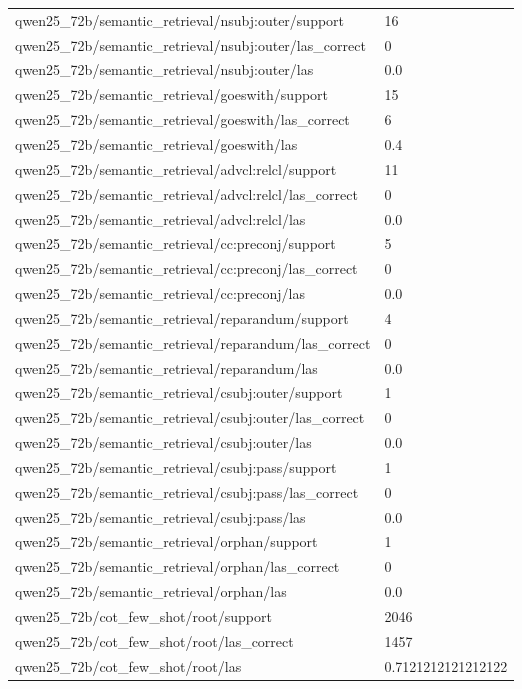 \begin{tabular}{ll}
qwen25\_72b/semantic\_retrieval/nsubj:outer/support & 16 \\
qwen25\_72b/semantic\_retrieval/nsubj:outer/las\_correct & 0 \\
qwen25\_72b/semantic\_retrieval/nsubj:outer/las & 0.0 \\
qwen25\_72b/semantic\_retrieval/goeswith/support & 15 \\
qwen25\_72b/semantic\_retrieval/goeswith/las\_correct & 6 \\
qwen25\_72b/semantic\_retrieval/goeswith/las & 0.4 \\
qwen25\_72b/semantic\_retrieval/advcl:relcl/support & 11 \\
qwen25\_72b/semantic\_retrieval/advcl:relcl/las\_correct & 0 \\
qwen25\_72b/semantic\_retrieval/advcl:relcl/las & 0.0 \\
qwen25\_72b/semantic\_retrieval/cc:preconj/support & 5 \\
qwen25\_72b/semantic\_retrieval/cc:preconj/las\_correct & 0 \\
qwen25\_72b/semantic\_retrieval/cc:preconj/las & 0.0 \\
qwen25\_72b/semantic\_retrieval/reparandum/support & 4 \\
qwen25\_72b/semantic\_retrieval/reparandum/las\_correct & 0 \\
qwen25\_72b/semantic\_retrieval/reparandum/las & 0.0 \\
qwen25\_72b/semantic\_retrieval/csubj:outer/support & 1 \\
qwen25\_72b/semantic\_retrieval/csubj:outer/las\_correct & 0 \\
qwen25\_72b/semantic\_retrieval/csubj:outer/las & 0.0 \\
qwen25\_72b/semantic\_retrieval/csubj:pass/support & 1 \\
qwen25\_72b/semantic\_retrieval/csubj:pass/las\_correct & 0 \\
qwen25\_72b/semantic\_retrieval/csubj:pass/las & 0.0 \\
qwen25\_72b/semantic\_retrieval/orphan/support & 1 \\
qwen25\_72b/semantic\_retrieval/orphan/las\_correct & 0 \\
qwen25\_72b/semantic\_retrieval/orphan/las & 0.0 \\
qwen25\_72b/cot\_few\_shot/root/support & 2046 \\
qwen25\_72b/cot\_few\_shot/root/las\_correct & 1457 \\
qwen25\_72b/cot\_few\_shot/root/las & 0.7121212121212122 \\

\end{tabular}
